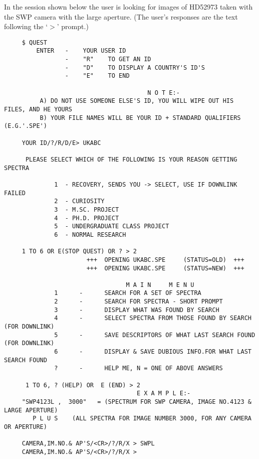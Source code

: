 In the session shown below the user is looking for images of HD52973 taken 
with the SWP camera with the large aperture. (The user's responses are the
text following the `$>$' prompt.)
\begin{footnotesize}
\begin{verbatim}
     $ QUEST
         ENTER   -    YOUR USER ID
                 -    "R"    TO GET AN ID
                 -    "D"    TO DISPLAY A COUNTRY'S ID'S
                 -    "E"    TO END
     
                                        N O T E:-                                    
          A) DO NOT USE SOMEONE ELSE'S ID, YOU WILL WIPE OUT HIS FILES, AND HE YOURS
          B) YOUR FILE NAMES WILL BE YOUR ID + STANDARD QUALIFIERS (E.G.'.SPE')
     
     YOUR ID/?/R/D/E> UKABC
 
      PLEASE SELECT WHICH OF THE FOLLOWING IS YOUR REASON GETTING SPECTRA

              1  - RECOVERY, SENDS YOU -> SELECT, USE IF DOWNLINK FAILED
              2  - CURIOSITY
              3  - M.SC. PROJECT
              4  - PH.D. PROJECT
              5  - UNDERGRADUATE CLASS PROJECT
              6  - NORMAL RESEARCH
      
     1 TO 6 OR E(STOP QUEST) OR ? > 2
                       +++  OPENING UKABC.SPE     (STATUS=OLD)  +++                   
                       +++  OPENING UKABC.SPE     (STATUS=NEW)  +++                   
  
                                  M A I N     M E N U
              1      -      SEARCH FOR A SET OF SPECTRA
              2      -      SEARCH FOR SPECTRA - SHORT PROMPT
              3      -      DISPLAY WHAT WAS FOUND BY SEARCH
              4      -      SELECT SPECTRA FROM THOSE FOUND BY SEARCH (FOR DOWNLINK)
              5      -      SAVE DESCRIPTORS OF WHAT LAST SEARCH FOUND (FOR DOWNLINK)
              6      -      DISPLAY & SAVE DUBIOUS INFO.FOR WHAT LAST SEARCH FOUND
              ?      -      HELP ME, N = ONE OF ABOVE ANSWERS

      1 TO 6, ? (HELP) OR  E (END) > 2
                                     E X A M P L E:-                                 
     "SWP4123L ,  3000"   = (SPECTRUM FOR SWP CAMERA, IMAGE NO.4123 & LARGE APERTURE)
        P L U S    (ALL SPECTRA FOR IMAGE NUMBER 3000, FOR ANY CAMERA OR APERTURE)   
     
     CAMERA,IM.NO.& AP'S/<CR>/?/R/X > SWPL
     CAMERA,IM.NO.& AP'S/<CR>/?/R/X >


\end{verbatim}
\end{footnotesize}

